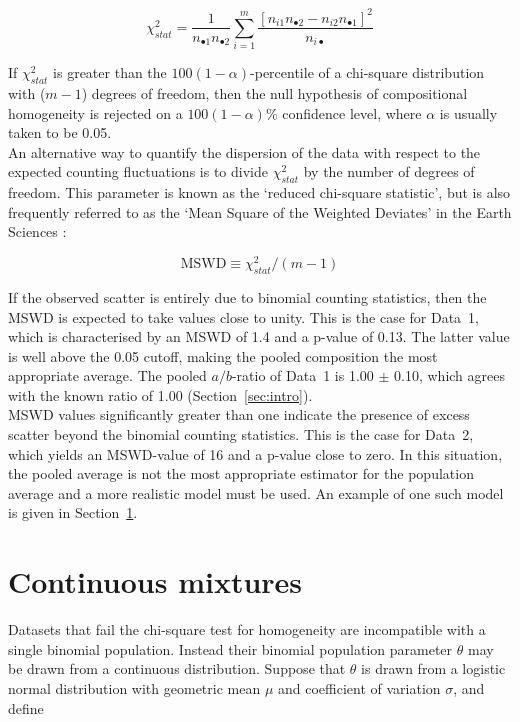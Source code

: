 \documentclass{article}
\begin{document}
\begin{equation}
  \chi_{stat}^{2} = \frac{1}{n_{\bullet 1} n_{\bullet 2}}
  \sum\limits_{i=1}^{m}
  \frac{\left[n_{i1}n_{\bullet2}-n_{i2}n_{\bullet 1}\right]^2}{n_{i\bullet}}
  \label{eq:X2}
\end{equation}

If $\chi_{stat}^2$ is greater than the $100(1-\alpha)$-percentile of a
chi-square distribution with ($m-1$) degrees of freedom, then the null
hypothesis of compositional homogeneity is rejected on a
$100(1-\alpha)\%$ confidence level, where $\alpha$ is usually taken to
be 0.05.\\

An alternative way to quantify the dispersion of the data with respect
to the expected counting fluctuations is to divide $\chi_{stat}^2$ by
the number of degrees of freedom. This parameter is known as the
`reduced chi-square statistic', but is also frequently referred to as
the `Mean Square of the Weighted Deviates' in the Earth Sciences
\citep{wendt1991}:

\begin{equation}
  \mbox{MSWD} \equiv \chi_{stat}^2/(m-1)
\end{equation}

If the observed scatter is entirely due to binomial counting
statistics, then the MSWD is expected to take values close to unity.
This is the case for Data~1, which is characterised by an MSWD of 1.4
and a p-value of 0.13. The latter value is well above the 0.05 cutoff,
making the pooled composition the most appropriate average. The pooled
$a/b$-ratio of Data~1 is 1.00 $\pm$ 0.10, which agrees with the known
ratio of 1.00 (Section~\ref{sec:intro}).\\

MSWD values significantly greater than one indicate the presence of
excess scatter beyond the binomial counting statistics.  This is the
case for Data~2, which yields an MSWD-value of 16 and a p-value close
to zero. In this situation, the pooled average is not the most
appropriate estimator for the population average and a more realistic
model must be used. An example of one such model is given in
Section~\ref{sec:randomeffects}.

\section{Continuous mixtures}
\label{sec:randomeffects}

Datasets that fail the chi-square test for homogeneity are
incompatible with a single binomial population. Instead their binomial
population parameter $\theta$ may be drawn from a continuous
distribution. Suppose that $\theta$ is drawn from a logistic normal
distribution with geometric mean $\mu$ and coefficient of variation
$\sigma$, and define
\end{document}
